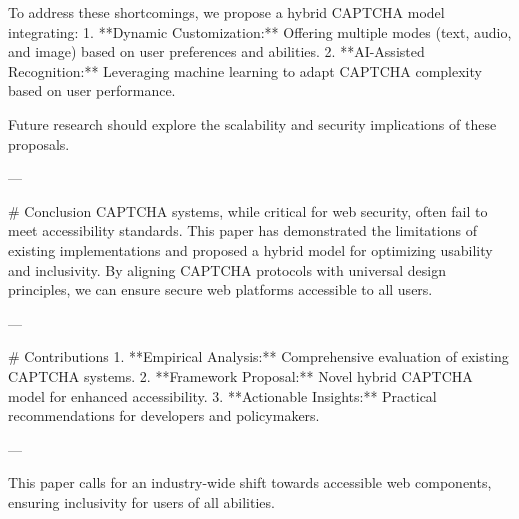 To address these shortcomings, we propose a hybrid CAPTCHA model integrating:  
1. **Dynamic Customization:** Offering multiple modes (text, audio, and image) based on user preferences and abilities.  
2. **AI-Assisted Recognition:** Leveraging machine learning to adapt CAPTCHA complexity based on user performance.  

Future research should explore the scalability and security implications of these proposals.

---

# Conclusion  
CAPTCHA systems, while critical for web security, often fail to meet accessibility standards. This paper has demonstrated the limitations of existing implementations and proposed a hybrid model for optimizing usability and inclusivity. By aligning CAPTCHA protocols with universal design principles, we can ensure secure web platforms accessible to all users.

---

# Contributions  
1. **Empirical Analysis:** Comprehensive evaluation of existing CAPTCHA systems.  
2. **Framework Proposal:** Novel hybrid CAPTCHA model for enhanced accessibility.  
3. **Actionable Insights:** Practical recommendations for developers and policymakers.

---

This paper calls for an industry-wide shift towards accessible web components, ensuring inclusivity for users of all abilities.